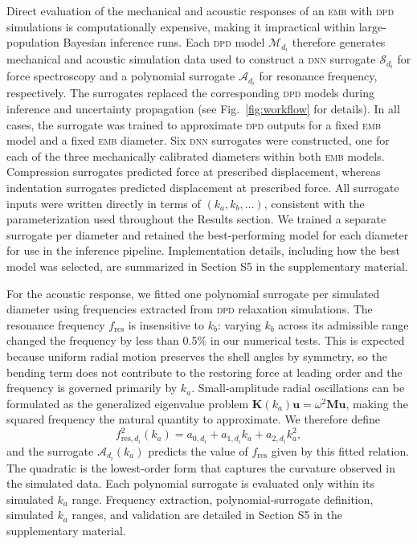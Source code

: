 \documentclass[%
 aip,
 jcp,
 amsmath,amssymb,
 preprint,%
]{revtex4-1}
\begin{document}
  \noindent Direct evaluation of the mechanical and acoustic responses of an \textsc{emb} with \textsc{dpd} simulations is computationally expensive, making it impractical within large-population Bayesian inference runs. Each \textsc{dpd} model $\mathcal{M}_{d_i}$ therefore generates mechanical and acoustic simulation data used to construct a \textsc{dnn} surrogate $\mathcal{S}_{d_i}$ for force spectroscopy and a polynomial surrogate $\mathcal{A}_{d_i}$ for resonance frequency, respectively. The surrogates replaced the corresponding \textsc{dpd} models during inference and uncertainty propagation (see Fig.~\ref{fig:workflow} for details). In all cases, the surrogate was trained to approximate \textsc{dpd} outputs for a fixed \textsc{emb} model and a fixed \textsc{emb} diameter. Six \textsc{dnn} surrogates were constructed, one for each of the three mechanically calibrated diameters within both \textsc{emb} models. Compression surrogates predicted force at prescribed displacement, whereas indentation surrogates predicted displacement at prescribed force. All surrogate inputs were written directly in terms of $(k_a,k_b,\ldots)$, consistent with the parameterization used throughout the Results section. We trained a separate surrogate per diameter and retained the best-performing model for each diameter for use in the inference pipeline. Implementation details, including how the best model was selected, are summarized in Section S5 in the supplementary
  material.

For the acoustic response, we fitted one polynomial surrogate per simulated diameter using frequencies extracted from \textsc{dpd} relaxation simulations. The resonance frequency $f_{\mathrm{res}}$ is insensitive to $k_b$: varying $k_b$ across its admissible range changed the frequency by less than 0.5\% in our numerical tests. This is expected because uniform radial motion preserves the shell angles by symmetry, so the bending term does not contribute to the restoring force at leading order and the frequency is governed primarily by $k_a$. Small-amplitude radial oscillations can be formulated as the generalized eigenvalue problem $\mathbf{K}(k_a)\mathbf{u}=\omega^2\mathbf{M}\mathbf{u}$, making the squared frequency the natural quantity to approximate. We therefore define
\begin{equation}
f_{\mathrm{res},d_i}^2(k_a)=a_{0,d_i}+a_{1,d_i}k_a+a_{2,d_i}k_a^2,
\end{equation}
and the surrogate $\mathcal{A}_{d_i}(k_a)$ predicts the value of $f_{\mathrm{res}}$ given by this fitted relation. The quadratic is the lowest-order form that captures the curvature observed in the simulated data. Each polynomial surrogate is evaluated only within its simulated $k_a$ range. Frequency extraction, polynomial-surrogate definition, simulated $k_a$ ranges, and validation are detailed in Section S5 in the supplementary material.
  
\end{document}
